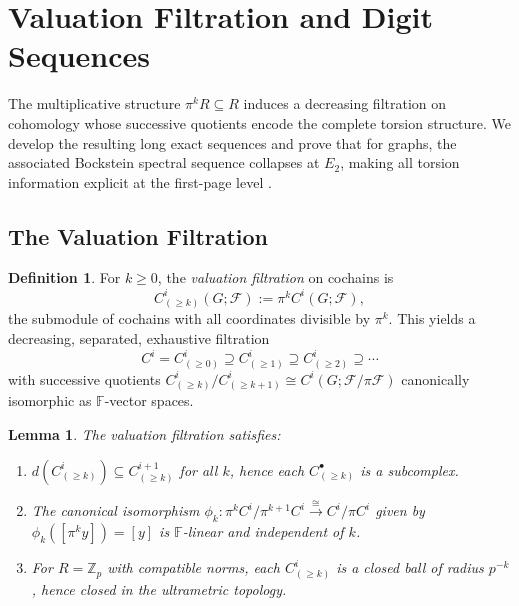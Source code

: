 \documentclass[11pt]{amsart}
\theoremstyle{plain}
\newtheorem{lemma}[theorem]{Lemma}
\theoremstyle{definition}
\newtheorem{definition}[theorem]{Definition}
\newcommand{\Zp}{\mathbb{Z}_p}                        %
\newcommand{\Ring}{R}                          %
\newcommand{\unif}{\pi}                        %
\newcommand{\sheaf}[1]{\mathcal{#1}}                  %
\newcommand{\coboundary}{d}                           %
\begin{document}
\section{Valuation Filtration and Digit Sequences}
\label{sec:bockstein-digit}

The multiplicative structure $\unif^k \Ring \subseteq \Ring$ induces a decreasing 
filtration on cohomology whose successive quotients encode the complete torsion 
structure. We develop the resulting long exact sequences and prove that for graphs, 
the associated Bockstein spectral sequence collapses at $E_2$, making all torsion 
information explicit at the first-page level \cite{McCleary2000}.


\subsection{The Valuation Filtration}
\label{ssec:val-filtration}

\begin{definition}
\label{def:val-filtration}
For $k \geq 0$, the \emph{valuation filtration} on cochains is
\[
C^i_{(\geq k)}(G; \sheaf{F}) := \unif^k C^i(G; \sheaf{F}),
\]
the submodule of cochains with all coordinates divisible by $\unif^k$. This yields 
a decreasing, separated, exhaustive filtration
\[
C^i = C^i_{(\geq 0)} \supseteq C^i_{(\geq 1)} \supseteq C^i_{(\geq 2)} \supseteq 
\cdots
\]
with successive quotients $C^i_{(\geq k)}/C^i_{(\geq k+1)} \cong C^i(G; \sheaf{F}/\unif\sheaf{F})$ 
canonically isomorphic as $\mathbb{F}$-vector spaces.
\end{definition}

\begin{lemma}
\label{lem:filtration-properties}
The valuation filtration satisfies:
\begin{enumerate}[label=\textup{(\roman*)}]
\item $\coboundary(C^i_{(\geq k)}) \subseteq C^{i+1}_{(\geq k)}$ for all $k$, 
hence each $C^\bullet_{(\geq k)}$ is a subcomplex.
\item The canonical isomorphism $\phi_k: \unif^k C^i/\unif^{k+1} C^i 
\xrightarrow{\cong} C^i/\unif C^i$ given by $\phi_k([\unif^k y]) = [y]$ is 
$\mathbb{F}$-linear and independent of $k$.
\item For $\Ring = \Zp$ with compatible norms, each $C^i_{(\geq k)}$ is a closed 
ball of radius $p^{-k}$, hence closed in the ultrametric topology.
\end{enumerate}
\end{lemma}
\end{document}
